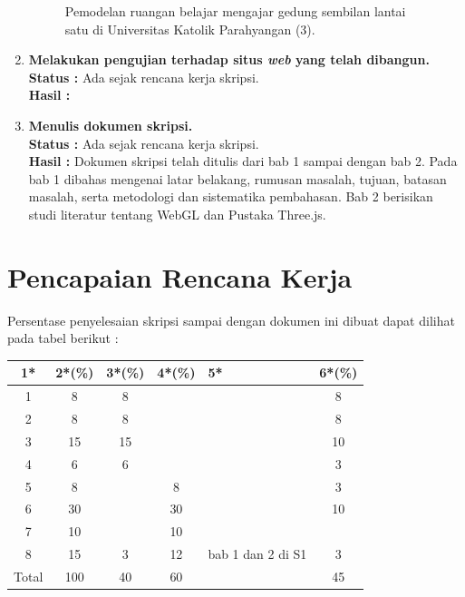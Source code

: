 \documentclass[a4paper,twoside]{article}
\begin{document}
\begin{enumerate}
\begin{figure}[H]
			\caption{Pemodelan ruangan belajar mengajar gedung sembilan lantai satu di Universitas Katolik Parahyangan (3).}
		\end{figure}

		\item \textbf{Melakukan pengujian terhadap situs \textit{\textbf{web}} yang telah dibangun.} \\
		{\bf Status :} Ada sejak rencana kerja skripsi.\\
		{\bf Hasil :}

		\item \textbf{Menulis dokumen skripsi.}\\
		{\bf Status :} Ada sejak rencana kerja skripsi.\\
		{\bf Hasil :} Dokumen skripsi telah ditulis dari bab 1 sampai dengan bab 2. Pada bab 1 dibahas mengenai latar belakang, rumusan masalah, tujuan, batasan masalah, serta metodologi dan sistematika pembahasan. Bab 2 berisikan studi literatur tentang WebGL dan Pustaka Three.js.
		
	\end{enumerate}

\section{Pencapaian Rencana Kerja}
Persentase penyelesaian skripsi sampai dengan dokumen ini dibuat dapat dilihat pada tabel berikut :

\begin{center}
  \begin{tabular}{ | c | c | c | c | l | c |}
    \hline
    1*  & 2*(\%) & 3*(\%) & 4*(\%) &5* &6*(\%) \\ \hline \hline
    1    & 8 & 8 &  &  & 8 \\ \hline
    2    & 8 & 8 &  &  & 8 \\ \hline
    3    & 15 & 15 &  & &  10 \\ \hline
    4    & 6 & 6 &  & & 3 \\ \hline
    5    & 8 &  & 8 & & 3 \\ \hline
    6    & 30 &  & 30 & & 10 \\ \hline
    7    & 10 &  & 10 & &  \\ \hline
    8    & 15 & 3 & 12 & bab 1 dan 2 di S1 & 3 \\ \hline
    Total   & 100 & 40 & 60 & & 45 \\ \hline
   \end{tabular}
\end{center}
\end{document}

